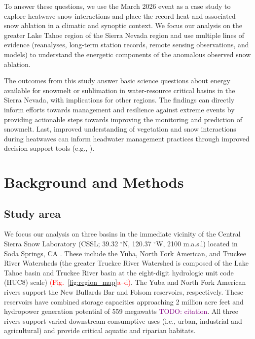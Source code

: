 \documentclass[draft]{agujournal2019}
\newcommand{\fig}[2]{\textcolor{red}{(Fig.~\ref{#1}{#2})}}   %
\newcommand{\todo}[1]{\textcolor{purple}{TODO: #1}}      %
\begin{document}
To answer these questions, we use the March 2026 event as a case study to explore heatwave-snow interactions and place the record heat and associated snow ablation in a climatic and synoptic context.
We focus our analysis on the greater Lake Tahoe region of the Sierra Nevada region and use multiple lines of evidence (reanalyses, long-term station records, remote sensing observations, and models) to understand the energetic components of the anomalous observed snow ablation.

The outcomes from this study answer basic science questions about energy available for snowmelt or sublimation in water-resource critical basins in the Sierra Nevada, with implications for other regions.
The findings can directly inform efforts towards management and resilience against extreme events by providing actionable steps towards improving the monitoring and prediction of snowmelt.
Last, improved understanding of vegetation and snow interactions during heatwaves can inform headwater management practices through improved decision support tools (e.g., ).


\section{Background and Methods}
\subsection{Study area}
We focus our analysis on three basins in the immediate vicinity of the Central Sierra Snow Laboratory (CSSL; 39.32 $^\circ$N, 120.37 $^\circ$W, 2100 m.a.s.l) located in Soda Springs, CA  \cite{Schwartz_Cowherd_McGurk_Mason_Riker-Coleman_Zutter_Lewis_2026}.
These include the Yuba, North Fork American, and Truckee River Watersheds (the greater Truckee River Watershed is composed of the Lake Tahoe basin and Truckee River basin at the eight-digit hydrologic unit code (HUC8) scale) \fig{fig:region_map}{a--d}.
The Yuba and North Fork American rivers support the New Bullards Bar and Folsom reservoirs, respectively.
These reservoirs have combined storage capacities approaching 2 million acre feet and hydropower generation potential of 559 megawatts \todo{citation}.
All three rivers support varied downstream consumptive uses (i.e., urban, industrial and agricultural) and provide critical aquatic and riparian habitats.
\end{document}
